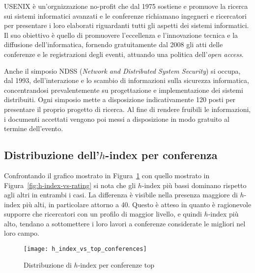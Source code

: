 USENIX \cite{usenix} è un'orgnizzazione no-profit che dal 1975 sostiene e promuove la ricerca sui sistemi informatici avanzati e le conferenze richiamano ingegneri e ricercatori per presentare i loro elaborati riguardanti tutti gli aspetti dei sistemi informatici. Il suo obiettivo è quello di promuovere l'eccellenza e l'innovazione tecnica e la diffusione dell'informatica, fornendo gratuitamente dal 2008 gli atti delle conferenze e le registrazioni degli eventi, attuando una politica dell'\textit{open access}. 

Anche il simposio NDSS \cite{ndss} (\textit{Network and Distributed System Security}) si occupa, dal 1993, dell'interazione e lo scambio di informazioni sulla sicurezza informatica, concentrandosi prevalentemente su progettazione e implementazione dei sistemi distribuiti. Ogni simposio mette a disposizione indicativamente 120 posti per presentare il proprio progetto di ricerca. Al fine di rendere fruibili le informazioni, i documenti accettati vengono poi messi a disposizione in modo gratuito al termine dell'evento.

\subsection{Distribuzione dell'$h$-index per conferenza}

Confrontando il grafico mostrato in Figura~\ref{fig:h_index_vs_top_conferences} con quello mostrato in Figura~\ref{fig:h-index-vs-rating} si nota che gli $h$-index più bassi dominano rispetto agli altri in entrambi i casi. La differenza è visibile nella presenza maggiore di $h$-index più alti, in particolare attorno a 40.
Questo è atteso in quanto è ragionevole supporre che ricercatori con un profilo di maggior livello, e quindi $h$-index più alto, tendano a sottomettere i loro lavori a conferenze considerate le migliori nel loro campo.

\begin{figure}[tb]
  \texttt{[image: h\_index\_vs\_top\_conferences]}
  \caption{Distribuzione di $h$-index per conferenze top}
  \label{fig:h_index_vs_top_conferences}
\end{figure}